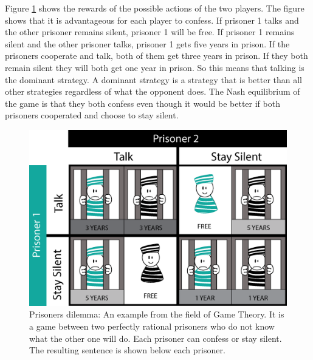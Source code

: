 
Figure \ref{Prison} shows the rewards of the possible actions of the two players. The figure shows that it is advantageous for each player to confess. If prisoner 1 talks and the other prisoner remains silent, prisoner 1 will be free. If prisoner 1 remains silent and the other prisoner talks, prisoner 1 gets five years in prison. If the prisoners cooperate and talk, both of them get three years in prison. If they both remain silent they will both get one year in prison. So this means that talking is the dominant strategy. A dominant strategy is a strategy that is better than all other strategies regardless of what the opponent does. The Nash equilibrium of the game is that they both confess even though it would be better if both prisoners cooperated and choose to stay silent. 

\begin{figure}[hbtp]
\centering
\includegraphics[scale=0.6]{Images/PrisDilemma}
\caption{Prisoners dilemma: An example from the field of Game Theory. It is a game between two perfectly rational prisoners who do not know what the other one will do. Each prisoner can confess or stay silent. The resulting sentence is shown below each prisoner. }
\label{Prison}
\end{figure}

